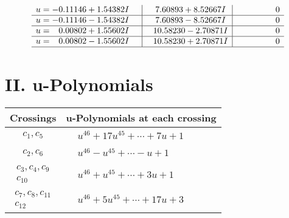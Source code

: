 \documentclass[1p]{elsarticle_modified}
\theoremstyle{definition}
\begin{document}
$$\begin{array}{c|c|c}
\begin{aligned}
u &= -0.11146 + 1.54382 I\end{aligned}
 & \phantom{-}7.60893 + 8.52667 I & \phantom{-0.000000 } 0 \\ \hline\begin{aligned}
u &= -0.11146 - 1.54382 I\end{aligned}
 & \phantom{-}7.60893 - 8.52667 I & \phantom{-0.000000 } 0 \\ \hline\begin{aligned}
u &= \phantom{-}0.00802 + 1.55602 I\end{aligned}
 & \phantom{-}10.58230 - 2.70871 I & \phantom{-0.000000 } 0 \\ \hline\begin{aligned}
u &= \phantom{-}0.00802 - 1.55602 I\end{aligned}
 & \phantom{-}10.58230 + 2.70871 I & \phantom{-0.000000 } 0\\
 \hline 
 \end{array}$$\newpage
\newpage\renewcommand{\arraystretch}{1}
\centering \section*{ II. u-Polynomials}
\begin{tabular}{m{50pt}|m{274pt}}
Crossings & \hspace{64pt}u-Polynomials at each crossing \\
\hline $$\begin{aligned}c_{1},c_{5}\end{aligned}$$&$\begin{aligned}
&u^{46}+17 u^{45}+\cdots+7 u+1
\end{aligned}$\\
\hline $$\begin{aligned}c_{2},c_{6}\end{aligned}$$&$\begin{aligned}
&u^{46}- u^{45}+\cdots- u+1
\end{aligned}$\\
\hline $$\begin{aligned}c_{3},c_{4},c_{9}\\c_{10}\end{aligned}$$&$\begin{aligned}
&u^{46}+u^{45}+\cdots+3 u+1
\end{aligned}$\\
\hline $$\begin{aligned}c_{7},c_{8},c_{11}\\c_{12}\end{aligned}$$&$\begin{aligned}
&u^{46}+5 u^{45}+\cdots+17 u+3
\end{aligned}$\\
\hline
\end{tabular}\newpage\renewcommand{\arraystretch}{1}
\end{document}

